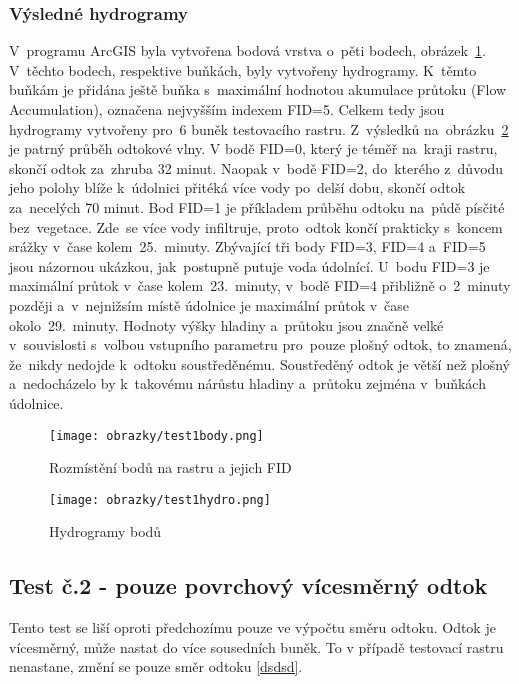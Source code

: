 \subsubsection{Výsledné hydrogramy} \label{subsubsection:test1hydro}
V~programu ArcGIS byla vytvořena bodová vrstva o~pěti bodech, obrázek~\ref{fig:test1body}. V~těchto bodech, respektive buňkách, byly vytvořeny hydrogramy. 
K~těmto buňkám je přidána ještě buňka s~maximální hodnotou akumulace průtoku (Flow Accumulation), označena nejvyšším indexem FID=5. Celkem tedy jsou hydrogramy vytvořeny pro~6 buněk testovacího rastru.  
Z~výsledků na~obrázku~\ref{fig:test1hydro} je patrný průběh odtokové vlny. V bodě FID=0, který je téměř na~kraji rastru, skončí odtok za~zhruba 32 minut. 
Naopak v~bodě FID=2, do~kterého z~důvodu jeho polohy blíže k~údolnici přitéká více vody po~delší dobu, skončí odtok za~necelých 70 minut. Bod FID=1 je příkladem průběhu odtoku na~půdě písčité bez~vegetace.
Zde~se více vody infiltruje, proto~odtok končí prakticky s~koncem srážky v~čase kolem~25.~minuty. Zbývající tři body FID=3, FID=4 a~FID=5 jsou názornou ukázkou, jak~postupně putuje voda údolnící.
U~bodu FID=3 je maximální průtok v~čase kolem~23.~minuty, v~bodě FID=4 přibližně o~2~minuty později a~v~nejnižsím místě údolnice je maximální průtok v~čase okolo~29.~minuty.
Hodnoty výšky hladiny a~průtoku jsou značně velké v~souvislosti s~volbou vstupního parametru pro~pouze plošný odtok, to znamená, že~nikdy nedojde k~odtoku soustředěnému. 
Soustředěný odtok je větší než plošný a~nedocházelo by k~takovému nárůstu hladiny a~průtoku zejména v~buňkách údolnice.   
\begin{figure}[hbt]
  \centering
  \texttt{[image: obrazky/test1body.png]}
  \caption{Rozmístění bodů na rastru a jejich FID}
  \label{fig:test1body}
\end{figure}
\begin{figure}[hbt]
  \centering
  \texttt{[image: obrazky/test1hydro.png]}
  \caption{Hydrogramy bodů}
  \label{fig:test1hydro}
\end{figure}
\clearpage
\subsection{Test č.2 - pouze povrchový vícesměrný odtok} \label{subsection:test2testovni}
Tento test se liší oproti předchozímu pouze ve výpočtu směru odtoku. Odtok je vícesměrný, může nastat do více sousedních buněk. To v případě testovací rastru nenastane, změní se pouze směr odtoku \ref{dsdsd}.
